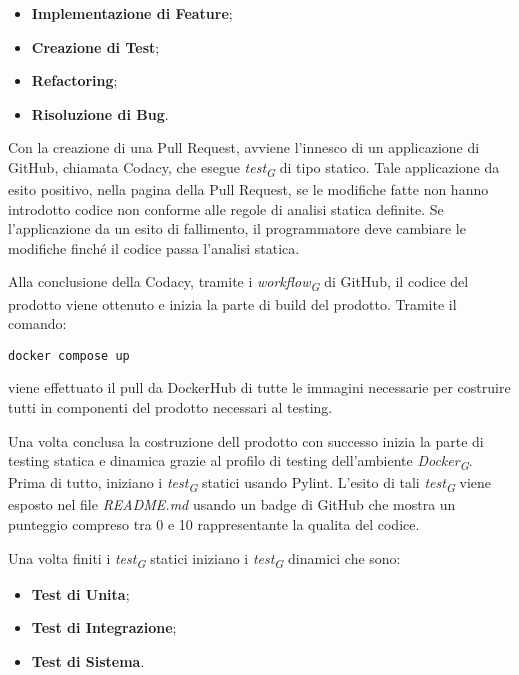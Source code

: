 \begin{itemize}
    \item \textbf{Implementazione di Feature};
    \item \textbf{Creazione di Test};
    \item \textbf{Refactoring};
    \item \textbf{Risoluzione di Bug}.
\end{itemize}

Con la creazione di una Pull Request, avviene l'innesco di un applicazione di GitHub, chiamata Codacy, che esegue \textit{test}\textsubscript{\textit{G}} di tipo statico. Tale applicazione da esito positivo, nella pagina della Pull Request, se le modifiche fatte non hanno introdotto codice non conforme alle regole di analisi statica definite. Se l'applicazione da un esito di fallimento, il programmatore deve cambiare le modifiche finché il codice passa l'analisi statica.

\vspace{0.2cm}

Alla conclusione della Codacy, tramite i \textit{workflow}\textsubscript{\textit{G}} di GitHub, il codice del prodotto viene ottenuto e inizia la parte di build del prodotto. Tramite il comando:
\begin{lstlisting}[style=code]
    docker compose up
\end{lstlisting}
viene effettuato il pull da DockerHub di tutte le immagini necessarie per costruire tutti in componenti del prodotto necessari al testing.

\vspace{0.2cm}

Una volta conclusa la costruzione dell prodotto con successo inizia la parte di testing statica e dinamica grazie al profilo di testing dell'ambiente \textit{Docker}\textsubscript{\textit{G}}. Prima di tutto, iniziano i \textit{test}\textsubscript{\textit{G}} statici usando Pylint. L'esito di tali \textit{test}\textsubscript{\textit{G}} viene esposto nel file \textit{README.md} usando un badge di GitHub che mostra un punteggio compreso tra 0 e 10 rappresentante la qualita del codice.


\vspace{0.2cm}

Una volta finiti i \textit{test}\textsubscript{\textit{G}} statici iniziano i \textit{test}\textsubscript{\textit{G}} dinamici che sono:

\begin{itemize}
    \item \textbf{Test di Unita};
    \item \textbf{Test di Integrazione};
    \item \textbf{Test di Sistema}.
\end{itemize}

